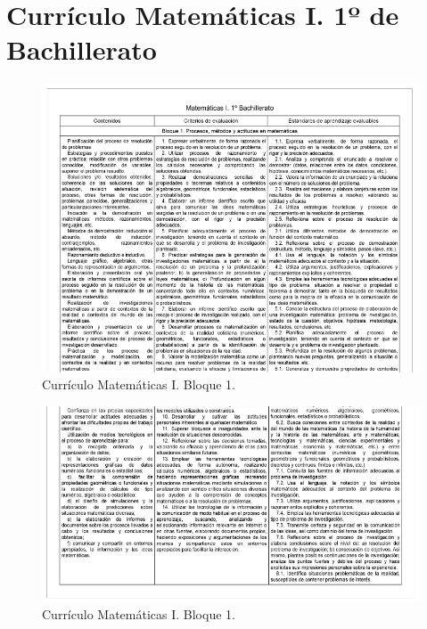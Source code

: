 \documentclass[a4paper, openright, 11pt, titlepage]{report}
\theoremstyle{definition}\newtheorem{defin}[propo]{Definition}
\theoremstyle{definition}\newtheorem{obser}[propo]{Remark}
\theoremstyle{definition}\newtheorem{ejem}[propo]{Ejemplo}
\theoremstyle{definition}\newtheorem{algoritmo}[propo]{Algoritmo}
\begin{document}
\chapter{Currículo Matemáticas I. 1º de Bachillerato}
 \begin{figure}[H]
     \centering
     \includegraphics[width = 1.1\textwidth]{Images/Apéndices/Apéndice B/curriculo1a.png}
     \caption{Currículo Matemáticas I. Bloque 1.}
 \end{figure}
  \begin{figure}[H]
     \centering
     \includegraphics[width = 1.1\textwidth]{Images/Apéndices/Apéndice B/curriculo1b.png}
     \caption{Currículo Matemáticas I. Bloque 1.}
 \end{figure}
\end{document}
